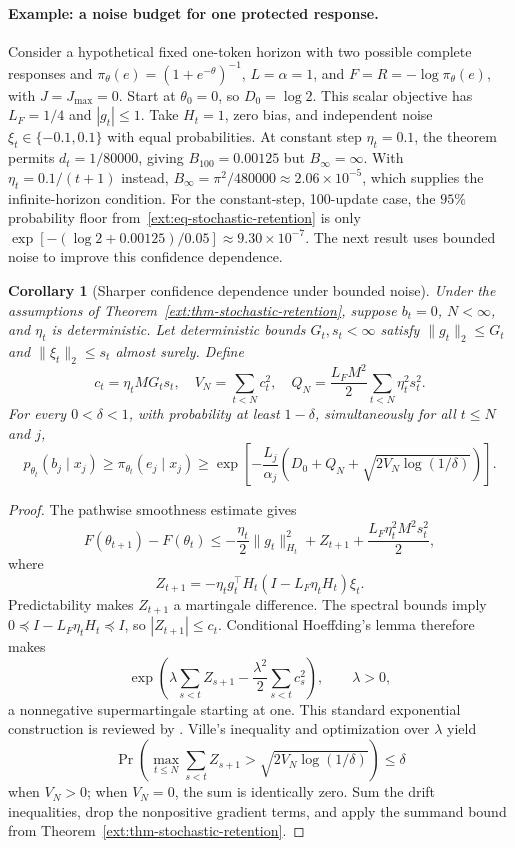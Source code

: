 \documentclass{article}
\newcommand{\1}{\mathbf 1}
\newtheorem{corollary}[lemma]{Corollary}
\theoremstyle{remark}
\theoremstyle{definition}
\theoremstyle{plain}
\begin{document}
\paragraph{Example: a noise budget for one protected response.}
Consider a hypothetical fixed one-token horizon with two possible complete
responses and
$\pi_\theta(e)=(1+e^{-\theta})^{-1}$, $L=\alpha=1$, and
$F=R=-\log\pi_\theta(e)$, with $J=J_{\max}=0$. Start at $\theta_0=0$, so
$D_0=\log2$. This scalar objective has $L_F=1/4$ and $|g_t|\le1$.
Take $H_t=1$, zero bias, and independent noise $\xi_t\in\{-0.1,0.1\}$ with
equal probabilities. At constant step $\eta_t=0.1$, the theorem permits
$d_t=1/80000$, giving $B_{100}=0.00125$ but $B_\infty=\infty$.
With $\eta_t=0.1/(t+1)$ instead,
$B_\infty=\pi^2/480000\approx2.06\times10^{-5}$, which supplies the
infinite-horizon condition. For the constant-step, 100-update case, the
$95\%$ probability floor from~\eqref{ext:eq-stochastic-retention} is only
$\exp[-(\log2+0.00125)/0.05]\approx9.30\times10^{-7}$.
The next result uses bounded noise to improve this confidence dependence.

\begin{corollary}[Sharper confidence dependence under bounded noise]
\label{ext:cor-bounded-noise-retention}
Under the assumptions of Theorem~\ref{ext:thm-stochastic-retention},
suppose $b_t=0$, $N<\infty$,
and $\eta_t$ is deterministic. Let deterministic bounds $G_t,s_t<\infty$
satisfy $\|g_t\|_2\le G_t$ and $\|\xi_t\|_2\le s_t$ almost surely. Define
\[
 c_t=\eta_tMG_ts_t,\quad V_N=\sum_{t<N}c_t^2,\quad
 Q_N=\frac{L_FM^2}{2}\sum_{t<N}\eta_t^2s_t^2.
\]
For every $0<\delta<1$, with probability at least $1-\delta$,
simultaneously for all $t\le N$ and $j$,
\begin{equation}
 p_{\theta_t}(b_j\mid x_j)\ge\pi_{\theta_t}(e_j\mid x_j)
 \ge\exp\!\left[-\frac{L_j}{\alpha_j}
   \left(D_0+Q_N+\sqrt{2V_N\log(1/\delta)}\right)\right].
 \label{ext:eq-bounded-noise-retention}
\end{equation}
\end{corollary}
\begin{proof}
The pathwise smoothness estimate gives
\[
 F(\theta_{t+1})-F(\theta_t)
 \le-\frac{\eta_t}{2}\|g_t\|_{H_t}^2+Z_{t+1}
       +\frac{L_F\eta_t^2M^2s_t^2}{2},
\]
where
\[
 Z_{t+1}=-\eta_t g_t^\top H_t(I-L_F\eta_tH_t)\xi_t.
\]
Predictability makes $Z_{t+1}$ a martingale difference. The spectral bounds
imply $0\preceq I-L_F\eta_tH_t\preceq I$, so $|Z_{t+1}|\le c_t$.
Conditional Hoeffding's lemma therefore makes
\[
 \exp\!\left(\lambda\sum_{s<t}Z_{s+1}
              -\frac{\lambda^2}{2}\sum_{s<t}c_s^2\right),\qquad\lambda>0,
\]
a nonnegative supermartingale starting at one. This standard exponential
construction is reviewed by \citet{howard2020timeuniform}. Ville's inequality
and optimization over $\lambda$ yield
\[
 \Pr\!\left(\max_{t\le N}\sum_{s<t}Z_{s+1}
              >\sqrt{2V_N\log(1/\delta)}\right)\le\delta
\]
when $V_N>0$; when $V_N=0$, the sum is identically zero. Sum the drift inequalities, drop the nonpositive gradient terms,
and apply the summand bound from Theorem~\ref{ext:thm-stochastic-retention}.
\end{proof}
\end{document}

